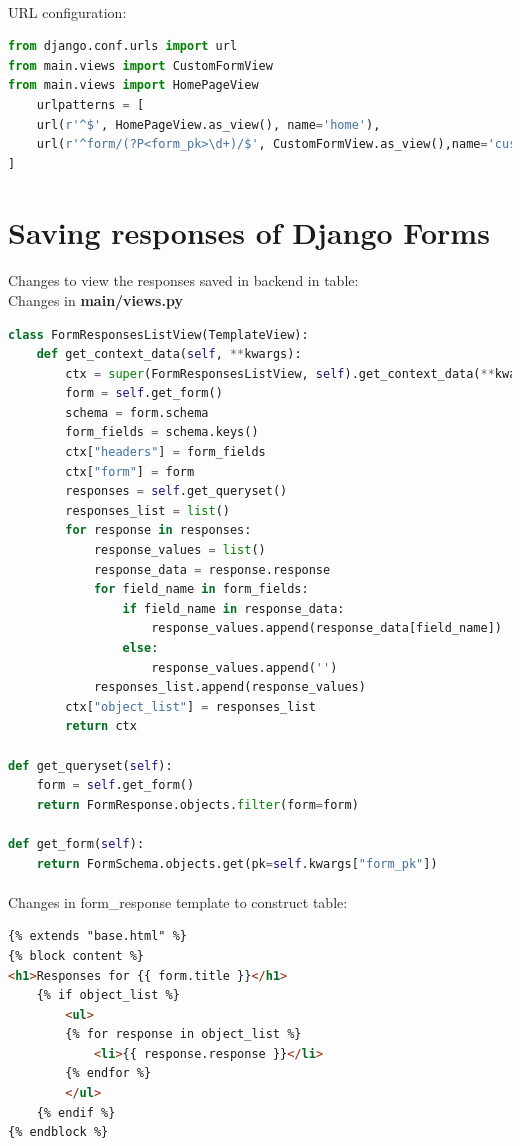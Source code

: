 \paragraph{} URL configuration:
\begin{lstlisting}[language=python,numbers=none]
from django.conf.urls import url
from main.views import CustomFormView
from main.views import HomePageView
	urlpatterns = [
	url(r'^$', HomePageView.as_view(), name='home'),
	url(r'^form/(?P<form_pk>\d+)/$', CustomFormView.as_view(),name='custom-form'),
]
\end{lstlisting}
\section{Saving responses of Django Forms}
\paragraph{}Changes to view the responses saved in backend in table:\\
Changes in \textbf{main/views.py}
\begin{lstlisting}[language=python,numbers=none]
class FormResponsesListView(TemplateView):
	def get_context_data(self, **kwargs):
		ctx = super(FormResponsesListView, self).get_context_data(**kwargs)
		form = self.get_form()
		schema = form.schema
		form_fields = schema.keys()
		ctx["headers"] = form_fields
		ctx["form"] = form
		responses = self.get_queryset()
		responses_list = list()
		for response in responses:
			response_values = list()
			response_data = response.response
			for field_name in form_fields:
				if field_name in response_data:
					response_values.append(response_data[field_name])
				else:
					response_values.append('')
			responses_list.append(response_values)
		ctx["object_list"] = responses_list
		return ctx

def get_queryset(self):
	form = self.get_form()
	return FormResponse.objects.filter(form=form)

def get_form(self):
	return FormSchema.objects.get(pk=self.kwargs["form_pk"])
\end{lstlisting}
\paragraph{}Changes in form\_response template to construct table:
\begin{lstlisting}[language=html,numbers=none]
{% extends "base.html" %}
{% block content %}
<h1>Responses for {{ form.title }}</h1>
	{% if object_list %}
		<ul>
		{% for response in object_list %}
			<li>{{ response.response }}</li>
		{% endfor %}
		</ul>
	{% endif %}
{% endblock %}
\end{lstlisting}
